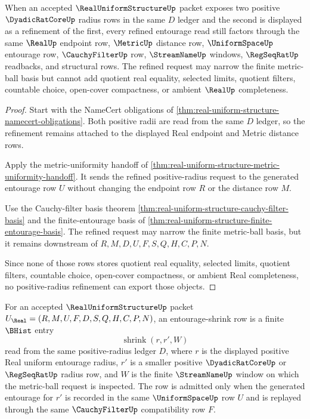 \begin{theorem}
\label{thm:real-uniform-structure-positive-radius-entourage-refinement}
When an accepted $\RealUniformStructureUp$ packet exposes two positive $\DyadicRatCoreUp$ radius rows in the same $D$ ledger and the second is displayed as a refinement of the first, every refined entourage read still factors through the same $\RealUp$ endpoint row, $\MetricUp$ distance row, $\UniformSpaceUp$ entourage row, $\CauchyFilterUp$ row, $\StreamNameUp$ windows, $\RegSeqRatUp$ readbacks, and structural rows. The refined request may narrow the finite metric-ball basis but cannot add quotient real equality, selected limits, quotient filters, countable choice, open-cover compactness, or ambient $\RealUp$ completeness.
\end{theorem}
\begin{proof}
Start with the NameCert obligations of \autoref{thm:real-uniform-structure-namecert-obligations}. Both positive radii are read from the same $D$ ledger, so the refinement remains attached to the displayed Real endpoint and Metric distance rows.

Apply the metric-uniformity handoff of \autoref{thm:real-uniform-structure-metric-uniformity-handoff}. It sends the refined positive-radius request to the generated entourage row $U$ without changing the endpoint row $R$ or the distance row $M$.

Use the Cauchy-filter basis theorem \autoref{thm:real-uniform-structure-cauchy-filter-basis} and the finite-entourage basis of \autoref{thm:real-uniform-structure-finite-entourage-basis}. The refined request may narrow the finite metric-ball basis, but it remains downstream of $R,M,D,U,F,S,Q,H,C,P,N$.

Since none of those rows stores quotient real equality, selected limits, quotient filters, countable choice, open-cover compactness, or ambient Real completeness, no positive-radius refinement can export those objects.
\end{proof}

\begin{definition}
\label{def:real-uniform-structure-entourage-shrink}
For an accepted $\RealUniformStructureUp$ packet $U_{\Real}=(R,M,U,F,D,S,Q,H,C,P,N)$, an entourage-shrink row is a finite $\BHist$ entry
$$
\operatorname{shrink}(r,r',W)
$$
read from the same positive-radius ledger $D$, where $r$ is the displayed positive Real uniform entourage radius, $r'$ is a smaller positive $\DyadicRatCoreUp$ or $\RegSeqRatUp$ radius row, and $W$ is the finite $\StreamNameUp$ window on which the metric-ball request is inspected. The row is admitted only when the generated entourage for $r'$ is recorded in the same $\UniformSpaceUp$ row $U$ and is replayed through the same $\CauchyFilterUp$ compatibility row $F$.
\end{definition}

